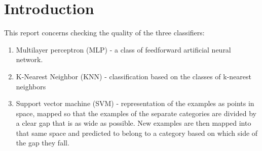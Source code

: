 \documentclass[
10pt, %
a4paper, %
oneside, %
headinclude,footinclude, %
BCOR5mm, %
]{scrartcl}
\title{\normalfont\spacedallcaps{Testing of classifiers}} %
\author{\spacedlowsmallcaps{Jan Bielecki}} %
\date{} %
\begin{document}

\renewcommand{\sectionmark}[1]{\markright{\spacedlowsmallcaps{#1}}} %
\lehead{\mbox{\llap{\small\thepage\kern1em\color{halfgray} \vline}\color{halfgray}\hspace{0.5em}\rightmark\hfil}} %

\pagestyle{scrheadings} %


\maketitle %

\setcounter{tocdepth}{2} %

\tableofcontents %





\section{Introduction}

This report concerns checking the quality of the three classifiers:

\begin{enumerate}[noitemsep] %
\item Multilayer perceptron (MLP) - a class of feedforward artificial neural network.
\item K-Nearest Neighbor (KNN) - classification based on the classes of k-nearest neighbors
\item Support vector machine (SVM) - representation of the examples as points in space, mapped so that the examples of the separate categories are divided by a clear gap that is as wide as possible. New examples are then mapped into that same space and predicted to belong to a category based on which side of the gap they fall.
\end{enumerate}
\end{document}
